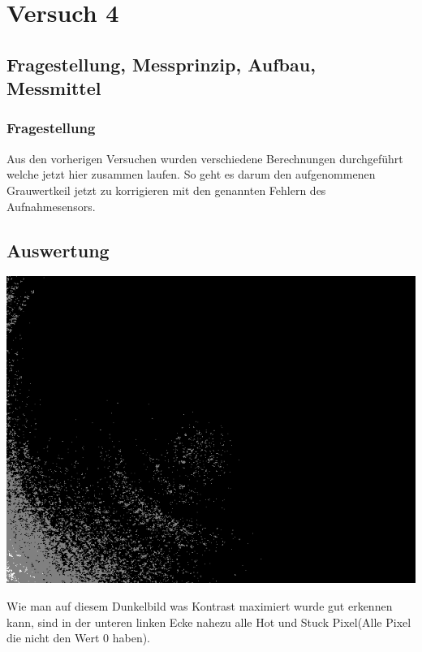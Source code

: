 \chapter{Versuch 4}
\label{chap:VERSUCH_4}

\section{Fragestellung, Messprinzip, Aufbau, Messmittel}
\label{chap:VERSUCH_4_FRAGESTELLUNG}

\subsection*{Fragestellung}
Aus den vorherigen Versuchen wurden verschiedene Berechnungen durchgeführt welche jetzt hier zusammen laufen. So geht es darum den aufgenommenen Grauwertkeil jetzt zu korrigieren mit den genannten Fehlern des Aufnahmesensors. 

\section{Auswertung}
\label{chap:VERSUCH_4_AUSWERTUNG}

\includegraphics[scale=0.6]{media/dunkelContrastMax}

Wie man auf diesem Dunkelbild was Kontrast maximiert wurde gut erkennen kann, sind in der unteren linken Ecke nahezu alle Hot und Stuck Pixel(Alle Pixel die nicht den Wert 0 haben).

